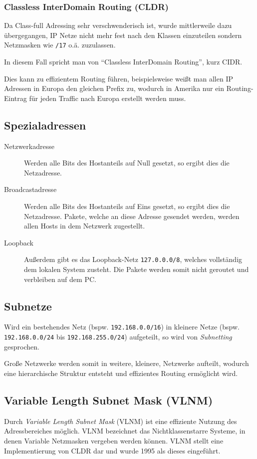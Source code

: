 		\subsubsection{Classless InterDomain Routing (CLDR)}
			Da Class-full Adressing sehr verschwenderisch ist, wurde mittlerweile dazu übergegangen, IP Netze nicht mehr fest nach den Klassen einzuteilen sondern Netzmasken wie \texttt{/17} o.ä. zuzulassen.

			In diesem Fall spricht man von \enquote{Classless InterDomain Routing}, kurz CIDR.

			Dies kann zu effizientem Routing führen, beispielsweise weißt man allen IP Adressen in Europa den gleichen Prefix zu, wodurch in Amerika nur ein Routing-Eintrag für jeden Traffic nach Europa erstellt werden muss.

	\subsection{Spezialadressen}
		\begin{description}
			\item[Netzwerkadresse] Werden alle Bits des Hostanteils auf Null gesetzt, so ergibt dies die Netzadresse.
			\item[Broadcastadresse] Werden alle Bits des Hostanteils auf Eins gesetzt, so ergibt dies die Netzadresse. Pakete, welche an diese Adresse gesendet werden, werden allen Hosts in dem Netzwerk zugestellt.
			\item[Loopback] Außerdem gibt es das Loopback-Netz \texttt{127.0.0.0/8}, welches vollständig dem lokalen System zusteht. Die Pakete werden somit nicht geroutet und verbleiben auf dem PC.
		\end{description}

	\subsection{Subnetze}
		Wird ein bestehendes Netz (bspw. \texttt{192.168.0.0/16}) in kleinere Netze (bspw. \texttt{192.168.0.0/24} bis \texttt{192.168.255.0/24}) aufgeteilt, so wird von \textit{Subnetting} gesprochen.

		Große Netzwerke werden somit in weitere, kleinere, Netzwerke aufteilt, wodurch eine hierarchische Struktur entsteht und effizientes Routing ermöglicht wird.

	\subsection{Variable Length Subnet Mask (VLNM)}
		Durch \textit{Variable Length Subnet Mask} (VLNM) ist eine effiziente Nutzung des Adressbereiches möglich. VLNM bezeichnet das Nichtklassenstarre Systeme, in denen Variable Netzmasken vergeben werden können. VLNM stellt eine Implementierung von CLDR dar und wurde 1995 als dieses eingeführt.

